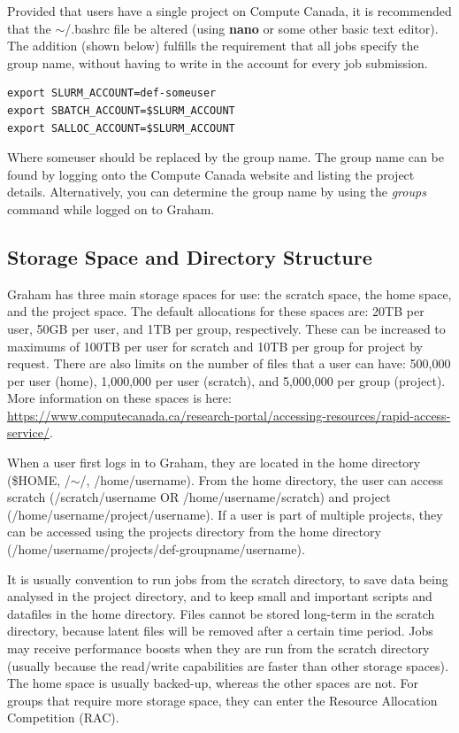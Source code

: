 \documentclass[12pt]{article}
\begin{document}
\quad Provided that users have a single project on Compute Canada, it is recommended that the $\sim$/.bashrc file be altered (using \textbf{nano} or some other basic text editor). The addition (shown below) fulfills the requirement that all jobs specify the group name, without having to write in the account for every job submission.

\begin{lstlisting}[numbers=none]
export SLURM_ACCOUNT=def-someuser
export SBATCH_ACCOUNT=$SLURM_ACCOUNT
export SALLOC_ACCOUNT=$SLURM_ACCOUNT 
\end{lstlisting}

Where someuser should be replaced by the group name. The group name can be found by logging onto the Compute Canada website and listing the project details. Alternatively, you can determine the group name by using the \textit{groups} command while logged on to Graham.

\subsection{Storage Space and Directory Structure}

\quad Graham has three main storage spaces for use: the scratch space, the home space, and the project space. The default allocations for these spaces are: 20TB per user, 50GB per user, and 1TB per group, respectively. These can be increased to maximums of 100TB per user for scratch and 10TB per group for project by request. There are also limits on the number of files that a user can have: 500,000 per user (home), 1,000,000 per user (scratch), and 5,000,000 per group (project). More information on these spaces is here: \url{https://www.computecanada.ca/research-portal/accessing-resources/rapid-access-service/}.

\quad When a user first logs in to Graham, they are located in the home directory (\$HOME, /$\sim$/, /home/username). From the home directory, the user can access scratch (/scratch/username OR /home/username/scratch) and project (/home/username/project/username). If a user is part of multiple projects, they can be accessed using the projects directory from the home directory (/home/username/projects/def-groupname/username). 

\quad It is usually convention to run jobs from the scratch directory, to save data being analysed in the project directory, and to keep small and important scripts and datafiles in the home directory. Files cannot be stored long-term in the scratch directory, because latent files will be removed after a certain time period. Jobs may receive performance boosts when they are run from the scratch directory (usually because the read/write capabilities are faster than other storage spaces). The home space is usually backed-up, whereas the other spaces are not. For groups that require more storage space, they can enter the Resource Allocation Competition (RAC). 
\end{document}
